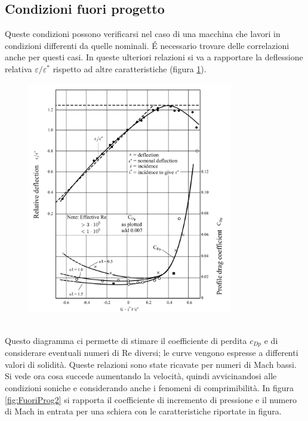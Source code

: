 \subsection{Condizioni fuori progetto}
Queste condizioni possono verificarsi nel caso di una macchina che lavori in condizioni differenti da quelle nominali. \'E necessario trovare delle correlazioni anche per questi casi. In queste ulteriori relazioni si va a rapportare la deflessione relativa $\varepsilon/\varepsilon^*$ rispetto ad altre caratteristiche (figura \ref{fig:FuoriProg1}).
\begin{figure}
\centering
  \includegraphics[width=0.8\textwidth]{fig/FuoriProg1.pdf}
\caption{}
\label{fig:FuoriProg1}
\end{figure}
\\Questo diagramma ci permette di stimare il coefficiente di perdita $c_{Dp}$ e di considerare eventuali numeri di Re diversi; le curve vengono espresse a differenti valori di solidità. Queste relazioni sono state ricavate per numeri di Mach bassi.\\
Si vede ora cosa succede aumentando la velocità, quindi avvicinandosi alle condizioni soniche e considerando anche i fenomeni di comprimibilità. In figura \ref{fig:FuoriProg2} si rapporta il coefficiente di incremento di pressione e il numero di Mach in entrata per una schiera con le caratteristiche riportate in figura.
